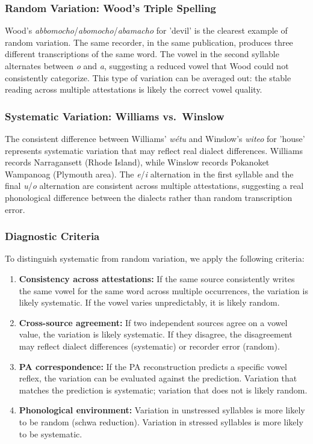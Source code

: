 \subsubsection{Random Variation: Wood's Triple Spelling}

Wood's \textit{abbomocho}/\textit{abomocho}/\textit{abamacho} for 'devil' is
the clearest example of random variation. The same recorder, in the same
publication, produces three different transcriptions of the same word. The
vowel in the second syllable alternates between \textit{o} and \textit{a},
suggesting a reduced vowel that Wood could not consistently categorize. This
type of variation can be averaged out: the stable reading across multiple
attestations is likely the correct vowel quality.

\subsubsection{Systematic Variation: Williams vs.\ Winslow}

The consistent difference between Williams' \textit{wétu} and Winslow's
\textit{witeo} for 'house' represents systematic variation that may reflect
real dialect differences. Williams records Narragansett (Rhode Island), while
Winslow records Pokanoket Wampanoag (Plymouth area). The \textit{e}/\textit{i}
alternation in the first syllable and the final \textit{u}/\textit{o}
alternation are consistent across multiple attestations, suggesting a real
phonological difference between the dialects rather than random transcription
error.

\subsubsection{Diagnostic Criteria}

To distinguish systematic from random variation, we apply the following
criteria:

\begin{enumerate}
  \item \textbf{Consistency across attestations:} If the same source
    consistently writes the same vowel for the same word across multiple
    occurrences, the variation is likely systematic. If the vowel varies
    unpredictably, it is likely random.

  \item \textbf{Cross-source agreement:} If two independent sources agree on
    a vowel value, the variation is likely systematic. If they disagree, the
    disagreement may reflect dialect differences (systematic) or recorder
    error (random).

  \item \textbf{PA correspondence:} If the PA reconstruction predicts a
    specific vowel reflex, the variation can be evaluated against the
    prediction. Variation that matches the prediction is systematic;
    variation that does not is likely random.

  \item \textbf{Phonological environment:} Variation in unstressed syllables
    is more likely to be random (schwa reduction). Variation in stressed
    syllables is more likely to be systematic.
\end{enumerate}

